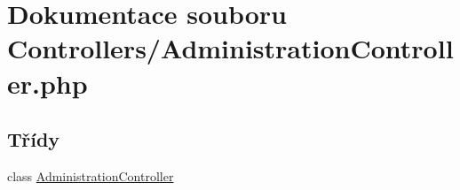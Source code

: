 \hypertarget{_administration_controller_8php}{\section{Dokumentace souboru Controllers/\-Administration\-Controller.php}
\label{_administration_controller_8php}
}
\subsection*{Třídy}
\begin{DoxyCompactItemize}
\item 
class \hyperlink{class_administration_controller}{Administration\-Controller}
\end{DoxyCompactItemize}
